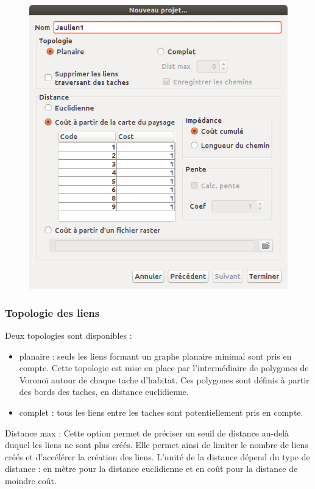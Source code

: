 \documentclass{article}
\begin{document}
\begin{figure}[H]
	\includegraphics[scale=0.5]{img/manual-fr_img4.png} 
\end{figure}

\subsubsection{Topologie des liens}

Deux topologies sont disponibles :
\begin{itemize}
	\item planaire : seuls les liens formant un graphe planaire minimal sont pris en compte. Cette topologie est mise en place par l’intermédiaire de polygones de Voronoï autour de chaque tache d’habitat. Ces polygones sont définis à partir des bords des taches, en distance euclidienne.
	\item complet : tous les liens entre les taches sont potentiellement pris en compte.
\end{itemize}

Distance max : Cette option permet de préciser un seuil de distance au-delà duquel les liens ne sont plus créés. Elle permet ainsi de limiter le nombre de liens créés et d’accélérer la création des liens. L'unité de la distance dépend du type de distance : en mètre pour la distance euclidienne et en coût pour la distance de moindre coût.
\end{document}
